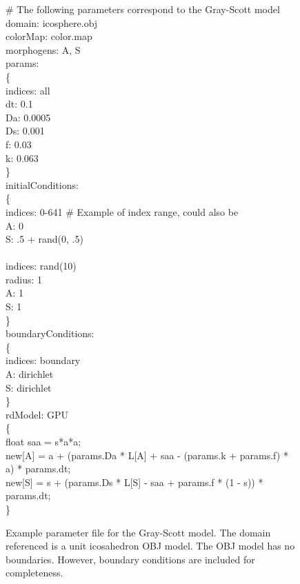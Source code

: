 \begin{figure}[p]
\LinesNotNumbered
\begin{algorithm}[H]
	\# The following parameters correspond to the Gray-Scott model \\	
	domain: icosphere.obj \\
	colorMap: color.map \\
	morphogens: A, S\\
	
	params:\\
	\{\\
\quad indices: all\\
\quad dt: 0.1\\
\quad Da: 0.0005\\
\quad Ds: 0.001\\
\quad f: 0.03\\
\quad k: 0.063\\
	\}\\
	initialConditions:\\
	\{\\
\quad indices: 0-641 \# Example of index range, could also be \\
\quad A: 0\\
\quad S: .5 + rand(0, .5)\\
\quad \\
\quad indices: rand(10)\\
\quad radius: 1\\
\quad A: 1\\
\quad S: 1\\
	\}\\
	boundaryConditions:\\
	\{\\
\quad indices: boundary \\
\quad A: dirichlet\\
\quad S: dirichlet\\
	\}\\
	rdModel: GPU\\
	\{\\
\quad float saa = s*a*a;\\
\quad new[A] = a + (params.Da * L[A] + saa - (params.k + params.f) * a) * params.dt;\\
\quad new[S] = s + (params.Ds * L[S] - saa + params.f * (1 - s)) * params.dt;\\
	\}
\end{algorithm}
	\caption{Example parameter file for the Gray-Scott model. The domain referenced is a unit icosahedron OBJ model. The OBJ model has no boundaries. However, boundary conditions are included for completeness.}
	\label{fig:paramFileExample}
\end{figure}

